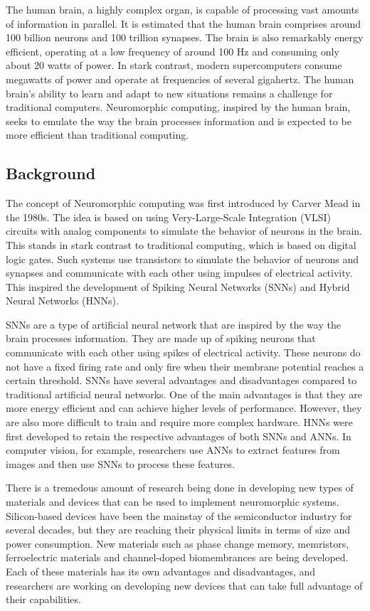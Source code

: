\documentclass[screen, acmtog]{acmart}
\begin{document}
The human brain, a highly complex organ, is capable of processing vast amounts of information in parallel. It is estimated that the human brain comprises around 100 billion neurons and 100 trillion synapses. The brain is also remarkably energy efficient, operating at a low frequency of around 100 Hz and consuming only about 20 watts of power. In stark contrast, modern supercomputers consume megawatts of power and operate at frequencies of several gigahertz. The human brain’s ability to learn and adapt to new situations remains a challenge for traditional computers. Neuromorphic computing, inspired by the human brain, seeks to emulate the way the brain processes information and is expected to be more efficient than traditional computing.


\subsection{Background}

The concept of Neuromorphic computing was first introduced by Carver Mead in the 1980s. The idea is based on using Very-Large-Scale Integration (VLSI) circuits with analog components to simulate the behavior of neurons in the brain. This stands in stark contrast to traditional computing, which is based on digital logic gates. Such systems use transistors to simulate the behavior of neurons and synapses and communicate with each other using impulses of electrical activity. This inspired the development of Spiking Neural Networks (SNNs) and Hybrid Neural Networks (HNNs).

SNNs are a type of artificial neural network that are inspired by the way the brain processes information. They are made up of spiking neurons that communicate with each other using spikes of electrical activity. These neurons do not have a fixed firing rate and only fire when their membrane potential reaches a certain threshold. SNNs have several advantages and disadvantages compared to traditional artificial neural networks. One of the main advantages is that they are more energy efficient and can achieve higher levels of performance. However, they are also more difficult to train and require more complex hardware. HNNs were first developed to retain the respective advantages of both SNNs and ANNs. In computer vision, for example, researchers use ANNs to extract features from images and then use SNNs to process these features.

There is a tremedous amount of research being done in developing new types of materials and devices that can be used to implement neuromorphic systems. Silicon-based devices have been the mainstay of the semiconductor industry for several decades, but they are reaching their physical limits in terms of size and power consumption. New materials such as phase change memory, memristors, ferroelectric materials and channel-doped biomembrances are being developed. Each of these materials has its own advantages and disadvantages, and researchers are working on developing new devices that can take full advantage of their capabilities.
\end{document}
